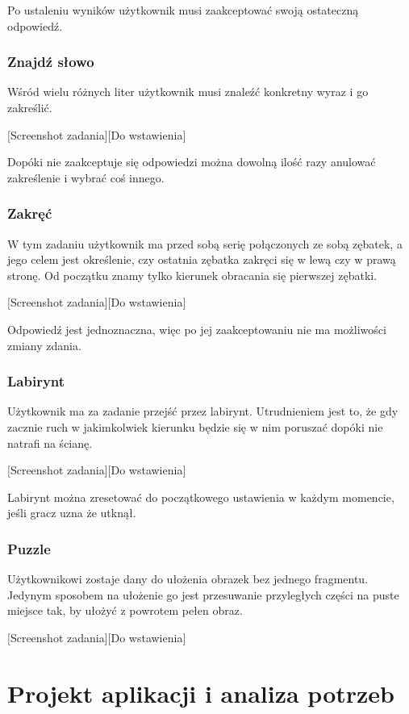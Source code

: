 \documentclass[openright]{xmgr}
\begin{document}
Po ustaleniu wyników użytkownik musi zaakceptować swoją ostateczną odpowiedź.

\subsection{Znajdź słowo}
Wśród wielu różnych liter użytkownik musi znaleźć konkretny wyraz i go zakreślić. 

[Screenshot zadania][Do wstawienia]

Dopóki nie zaakceptuje się odpowiedzi można dowolną ilość razy anulować zakreślenie i wybrać coś innego.

\subsection{Zakręć}
W tym zadaniu użytkownik ma przed sobą serię połączonych ze sobą zębatek, a jego celem jest określenie, czy ostatnia zębatka zakręci się w lewą czy w prawą stronę. Od początku znamy tylko kierunek obracania się pierwszej zębatki.

[Screenshot zadania][Do wstawienia]

Odpowiedź jest jednoznaczna, więc po jej zaakceptowaniu nie ma możliwości zmiany zdania.

\subsection{Labirynt}
Użytkownik ma za zadanie przejść przez labirynt. Utrudnieniem jest to, że gdy zacznie ruch w jakimkolwiek kierunku będzie się w nim poruszać dopóki nie natrafi na ścianę.

[Screenshot zadania][Do wstawienia]

Labirynt można zresetować do początkowego ustawienia w każdym momencie, jeśli gracz uzna że utknął.

\subsection{Puzzle}
Użytkownikowi zostaje dany do ułożenia obrazek bez jednego fragmentu. Jedynym sposobem na ułożenie go jest przesuwanie przyległych części na puste miejsce tak, by ułożyć z powrotem pełen obraz.

[Screenshot zadania][Do wstawienia]




\chapter{Projekt aplikacji i analiza potrzeb}
 
\end{document}
